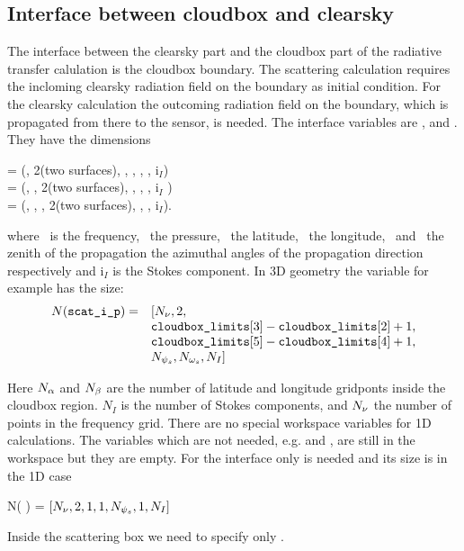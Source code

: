 \subsection{Interface between cloudbox and clearsky}
\label{sec:scattering:interface}
The interface between the clearsky part and the cloudbox part of the
radiative transfer calulation is the cloudbox boundary. The scattering
calculation requires the incloming clearsky radiation field on the
boundary as initial condition. For the clearsky calculation the
outcoming radiation field on the boundary, which is propagated from
there to the sensor, is needed.  The interface variables are
,  and
. They have the dimensions
\begin{center}
   =  (\Frq, 2(two surfaces), \Lat, \Lon, \ScaZa, \ScaAa, i$_I$)\\
   =  (\Frq, \Prs,
  2(two surfaces), \Lon, \ScaZa,
  \ScaAa, i$_I$ )\\
   =  (\Frq, \Prs,
  \Lat, 2(two surfaces), \ScaZa, \ScaAa, i$_I$).
\end{center}
where \Frq\ is the frequency, \Prs\ the pressure, \Lat\ the latitude,
\Lon\ the longitude, \ScaZa\ and \ScaAa\ the zenith of the propagation
the azimuthal angles of the propagation direction respectively and
i$_I$ is the Stokes component.  In 3D geometry the variable
 for example has the size:
\[ \begin{array}{rl}
  N(\texttt{scat\_i\_p}) =& [ N_{\nu}, 2,\\
   &\texttt{cloudbox\_limits}[3] -\texttt{cloudbox\_limits}[2] + 1, \\
   &\texttt{cloudbox\_limits}[5] -\texttt{cloudbox\_limits}[4] + 1,  \\
   &N_{{\psi_s}}, N_{{\omega_s}}, N_I]
\end{array} 
\] 

Here $N_{\alpha}$ and $N_{\beta}$ are the number of latitude and longitude
gridponts inside the cloudbox region.  $N_I$ is the number of Stokes components, and $N_{\nu}$
the number of points in the frequency grid.  There are no special
workspace variables for 1D calculations. The variables which are not
needed, e.g.  and , are
still in the workspace but they are empty. For the interface only
 is needed and its size is in the 1D case
\begin{center}
  N(  ) = $[N_{\nu}, 2, 1, 1, N_{{\psi_s}}, 1, N_I]$
\end{center}  
Inside the scattering box we need to specify only
.



